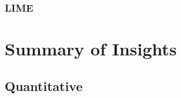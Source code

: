 \documentclass[main]{subfiles}
\begin{document}
\subsubsection{LIME}




\newpage
\section{Summary of Insights}
\subsection{Quantitative}
\end{document}

